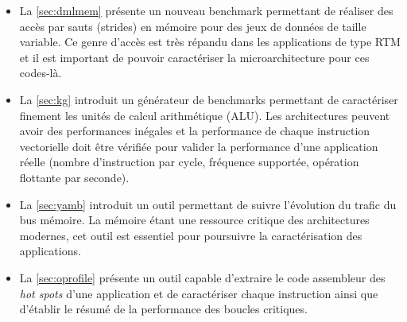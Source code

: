    \begin{itemize}
       \item La \autoref{sec:dmlmem} présente un nouveau benchmark permettant de réaliser des accès par sauts (strides) en mémoire pour des jeux de données de taille variable. Ce genre d'accès est très répandu dans les applications de type RTM et il est important de pouvoir caractériser la microarchitecture pour ces codes-là.
       \item La \autoref{sec:kg} introduit un générateur de benchmarks permettant de caractériser finement les unités de calcul arithmétique (ALU). Les architectures peuvent avoir des performances inégales et la performance de chaque instruction vectorielle doit être vérifiée pour valider la performance d'une application réelle (nombre d'instruction par cycle, fréquence supportée, opération flottante par seconde).
       \item La \autoref{sec:yamb} introduit un outil permettant de suivre l'évolution du trafic du bus mémoire. La mémoire étant une ressource critique des architectures modernes, cet outil est essentiel pour poursuivre la caractérisation des applications.
       \item La \autoref{sec:oprofile} présente un outil capable d'extraire le code assembleur des \textit{hot spots} d'une application et de caractériser chaque instruction ainsi que d'établir le résumé de la performance des boucles critiques.
   \end{itemize}
   
     
